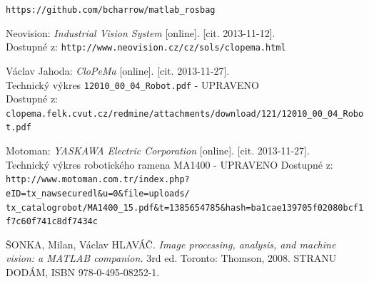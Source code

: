 \documentclass[10pt,a4paper,titlepage,oneside]{report}
\begin{document}
\begin{thebibliography}{00}
\verb|https://github.com/bcharrow/matlab_rosbag|

   Neovision:
    \emph{Industrial Vision System} [online]. [cit. 2013-11-12].\\
    Dostupné z: \verb|http://www.neovision.cz/cz/sols/clopema.html|    

   Václav Jahoda:
    \emph{CloPeMa} [online]. [cit. 2013-11-27].\\
    Technický výkres \verb|12010_00_04_Robot.pdf| - UPRAVENO\\
    Dostupné z: \verb|clopema.felk.cvut.cz/redmine/attachments/download/121/12010_00_04_Robot.pdf|    

   Motoman:
    \emph{YASKAWA Electric Corporation} [online]. [cit. 2013-11-27].\\
    Technický výkres robotického ramena MA1400 - UPRAVENO
    Dostupné z: \verb|http://www.motoman.com.tr/index.php?eID=tx_nawsecuredl&u=0&file=uploads/|\\
    \verb|tx_catalogrobot/MA1400_15.pdf&t=1385654785&hash=ba1cae139705f02080bcf1f7c60f741c8df7434c|
    
   ŠONKA, Milan, Václav HLAVÁČ.
    \emph{Image processing, analysis, and machine vision: a MATLAB companion.} 3rd ed. Toronto: Thomson, 2008. STRANU DODÁM, ISBN 978-0-495-08252-1. 

\end{thebibliography}
\end{document}
